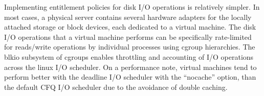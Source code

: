  
Implementing entitlement policies for disk I/O operations is relatively simpler. In most cases, a physical server contains several hardware adapters for the locally attached storage or block devices, each dedicated to a virtual machine. The disk I/O operations that a virtual machine performs can be specifically rate-limited for reads/write operations by individual processes using cgroup hierarchies. The blkio subsystem of cgroups enables throttling and accounting of I/O operations across the linux I/O scheduler. On a performance note, virtual machines tend to perform better with the deadline I/O scheduler with the ``nocache'' option, than the default CFQ I/O scheduler due to the avoidance of double caching.
 
%
%
%
%
%
